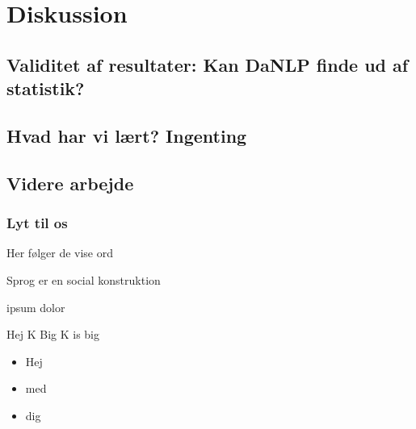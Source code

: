 \documentclass{beamer}
\begin{document}
\section{Diskussion}
\subsection{Validitet af resultater: Kan DaNLP finde ud af statistik?}
\subsection{Hvad har vi lært? Ingenting}
\subsection{Videre arbejde}

\begin{frame}
    \frametitle{Lyt til os}
    Her følger de vise ord
    \begin{definition}
        Sprog er en social konstruktion
    \end{definition}
    \begin{example}
        ipsum dolor
    \end{example}
    \begin{block}{Hej K}
        Big K is big
    \end{block}
    \begin{itemize}
        \pause
        \item Hej
        \pause
        \item med
        \pause
        \item dig
    \end{itemize}
\end{frame}
\end{document}
